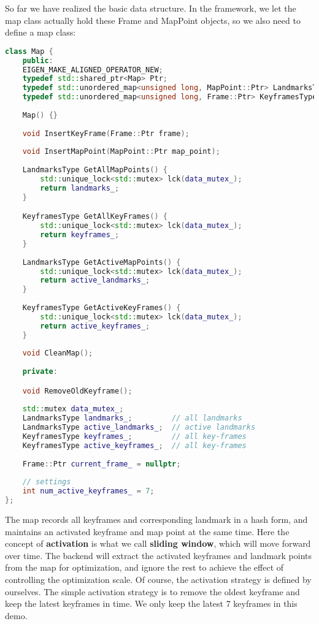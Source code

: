 So far we have realized the basic data structure. In the framework, we let the map class actually hold these Frame and MapPoint objects, so we also need to define a map class:

\begin{lstlisting}[language=c++,caption=slambook2/ch13/include/myslam/map.h]
class Map {
	public:
	EIGEN_MAKE_ALIGNED_OPERATOR_NEW;
	typedef std::shared_ptr<Map> Ptr;
	typedef std::unordered_map<unsigned long, MapPoint::Ptr> LandmarksType;
	typedef std::unordered_map<unsigned long, Frame::Ptr> KeyframesType;
	
	Map() {}
	
	void InsertKeyFrame(Frame::Ptr frame);
	
	void InsertMapPoint(MapPoint::Ptr map_point);
	
	LandmarksType GetAllMapPoints() {
		std::unique_lock<std::mutex> lck(data_mutex_);
		return landmarks_;
	}

	KeyframesType GetAllKeyFrames() {
		std::unique_lock<std::mutex> lck(data_mutex_);
		return keyframes_;
	}
	
	LandmarksType GetActiveMapPoints() {
		std::unique_lock<std::mutex> lck(data_mutex_);
		return active_landmarks_;
	}
	
	KeyframesType GetActiveKeyFrames() {
		std::unique_lock<std::mutex> lck(data_mutex_);
		return active_keyframes_;
	}
	
	void CleanMap();
	
	private:

	void RemoveOldKeyframe();
	
	std::mutex data_mutex_;
	LandmarksType landmarks_;         // all landmarks
	LandmarksType active_landmarks_;  // active landmarks
	KeyframesType keyframes_;         // all key-frames
	KeyframesType active_keyframes_;  // all key-frames
	
	Frame::Ptr current_frame_ = nullptr;
	
	// settings
	int num_active_keyframes_ = 7;  
};
\end{lstlisting}

The map records all keyframes and corresponding landmark in a hash form, and maintains an activated keyframe and map point at the same time. Here the concept of \textbf{activation} is what we call \textbf{sliding window}, which will move forward over time. The backend will extract the activated keyframes and landmark points from the map for optimization, and ignore the rest to achieve the effect of controlling the optimization scale. Of course, the activation strategy is defined by ourselves. The simple activation strategy is to remove the oldest keyframe and keep the latest keyframes in time. We only keep the latest 7 keyframes in this demo.

